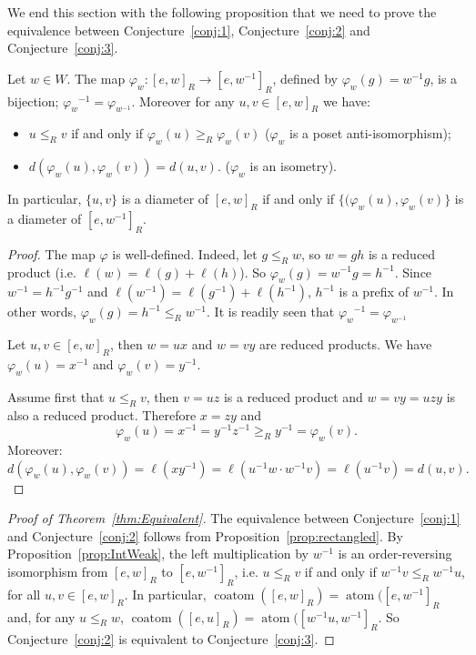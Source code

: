\documentclass[Unicode]{cedram-alco}
\theoremstyle{definition}
\newcommand{\coatom}{\operatorname{coatom}}
\newcommand{\atom}{\operatorname{atom}}
\begin{document}
We end this section with the following proposition that we need to prove the equivalence between Conjecture~\ref{conj:1},  Conjecture~\ref{conj:2} and Conjecture~\ref{conj:3}.

\begin{prop}\label{prop:IntWeak} Let $w\in W$. The map $\varphi_w: [e,w]_R\to [e,w^{-1}]_R$, defined by $\varphi_w(g)=w^{-1}g$, is a bijection; $\varphi_w{}^{-1} = \varphi_{w^{-1}}$. Moreover for any $u,v\in [e,w]_R$ we have: 
\begin{itemize}
\item $u\leq_R v$ if and only if $\varphi_w(u)\geq_R\varphi_w(v)$ ($\varphi_w$ is a poset anti-isomorphism);
\item  $d(\varphi_w(u),\varphi_w(v))=d(u,v).$ ($\varphi_w$ is an isometry).
\end{itemize}
In particular, $\{u,v\}$ is a diameter of $ [e,w]_R$ if and only if $\{(\varphi_w(u),\varphi_w(v)\}$ is a diameter of  $[e,w^{-1}]_R$.
\end{prop}
 \begin{proof} The map $\varphi$ is well-defined. Indeed, let $g\leq_R w$, so $w=gh$ is a reduced product (i.e.  $\ell(w)=\ell(g)+\ell(h)$). So $\varphi_w(g)= w^{-1}g=h^{-1}$. Since $w^{-1}=h^{-1}g^{-1}$ and  $\ell(w^{-1})=\ell(g^{-1})+\ell(h^{-1})$, $h^{-1}$ is a prefix of $w^{-1}$. In other words, $\varphi_w(g)=h^{-1}\leq_R w^{-1}$. It is readily seen that $\varphi_w{}^{-1} = \varphi_{w^{-1}}$ 
 
Let $u,v\in [e,w]_R$, then $w=ux$ and $w=vy$ are reduced products. We have $\varphi_w(u)=x^{-1}$ and $\varphi_w(v)=y^{-1}$. 

Assume first that $u\leq_R v$, then $v=uz$ is a reduced product and $w=vy=uzy$ is also a reduced product. Therefore $x=zy$ and 
$$
\varphi_w(u)=x^{-1}=y^{-1}z^{-1}\geq_R y^{-1}=\varphi_w(v). 
$$
Moreover: $d(\varphi_w(u),\varphi_w(v))=\ell(xy^{-1})=\ell(u^{-1}w\cdot w^{-1}v)=\ell(u^{-1}v)=d(u,v). $
 \end{proof}
 
 \begin{proof}[Proof of Theorem~\ref{thm:Equivalent}] The equivalence between Conjecture~\ref{conj:1} and Conjecture~\ref{conj:2} follows from Proposition~\ref{prop:rectangled}. By  Proposition~\ref{prop:IntWeak}, the left multiplication by $w^{-1}$ is an order-reversing isomorphism from $[e,w]_R$ to $[e,w^{-1}]_R$, i.e.  $u\leq_R v$ if and only if $w^{-1}v\leq_R w^{-1}u$, for all $u,v\in [e,w]_R$. In particular,  $\coatom([e,w]_R)=\atom([e,w^{-1}]_R$ and, for any $u\leq_R w$, $\coatom([e,u]_R)=\atom([w^{-1}u,w^{-1}]_R$. So Conjecture~\ref{conj:2} is equivalent to Conjecture~\ref{conj:3}.
 \end{proof}
 
\end{document}
